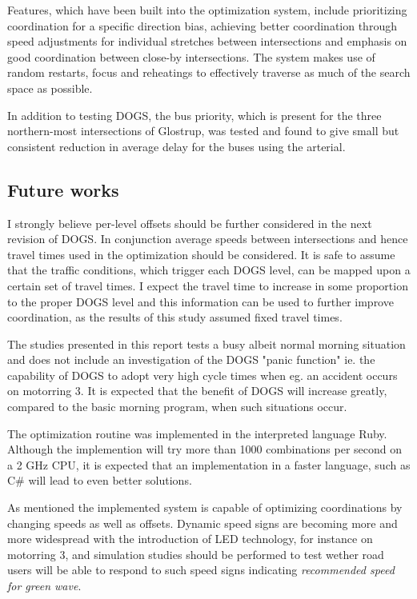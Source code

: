 Features, which have been built into the optimization system, include prioritizing coordination for a specific direction bias, achieving better coordination through speed adjustments for individual stretches between intersections and emphasis on good coordination between close-by intersections. The system makes use of random restarts, focus and reheatings to effectively traverse as much of the search space as possible.

In addition to testing DOGS, the bus priority, which is present for the three northern-most intersections of Glostrup, was tested and found to give small but consistent reduction in average delay for the buses using the arterial.

\subsection{Future works}
I strongly believe per-level offsets should be further considered in the next revision of DOGS. In conjunction average speeds between intersections and hence travel times used in the optimization should be considered. It is safe to assume that the traffic conditions, which trigger each DOGS level, can be mapped upon a certain set of travel times. I expect the travel time to increase in some proportion to the proper DOGS level and this information can be used to further improve coordination, as the results of this study assumed fixed travel times.

The studies presented in this report tests a busy albeit normal morning situation and does not include an investigation of the DOGS "panic function" ie. the capability of DOGS to adopt very high cycle times when eg. an accident occurs on motorring 3. It is expected that the benefit of DOGS will increase greatly, compared to the basic morning program, when such situations occur.

The optimization routine was implemented in the interpreted language Ruby. Although the implemention will try more than 1000 combinations per second on a 2 GHz CPU, it is expected that an implementation in a faster language, such as C\# will lead to even better solutions.

As mentioned the implemented system is capable of optimizing coordinations by changing speeds as well as offsets. Dynamic speed signs are becoming more and more widespread with the introduction of LED technology, for instance on motorring 3, and simulation studies should be performed to test wether road users will be able to respond to such speed signs indicating \textit{recommended speed for green wave}.

